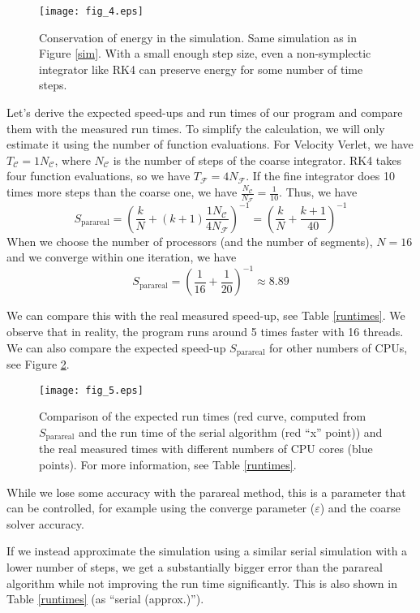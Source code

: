 \documentclass[conference]{IEEEtran}
\begin{document}
\begin{figure}[htbp]
\centerline{\texttt{[image: fig\_4.eps]}}
\caption{Conservation of energy in the simulation. Same simulation as in Figure \ref{sim}. With a small enough step size, even a non-symplectic integrator like RK4 can preserve energy for some number of time steps.}
\label{energy}
\end{figure}

Let's derive the expected speed-ups and run times of our program and compare them with the measured run times. To simplify the calculation, we will only estimate it using the number of function evaluations. For Velocity Verlet, we have $T_\mathcal{C} = 1N_\mathcal{C}$, where $N_\mathcal{C}$ is the number of steps of the coarse integrator. RK4 takes four function evaluations, so we have $T_\mathcal{F} = 4N_\mathcal{F}$. If the fine integrator does 10 times more steps than the coarse one, we have $\frac{N_\mathcal{C}}{N_\mathcal{F}} = \frac{1}{10}$. Thus, we have
$$
S_\text{parareal} = \left(\frac{k}{N} + (k+1)\frac{1N_\mathcal{C}}{4N_\mathcal{F}}\right)^{-1} = \left(\frac{k}{N} + \frac{k+1}{40}\right)^{-1}
$$
When we choose the number of processors (and the number of segments), $N = 16$ and we converge within one iteration, we have
$$
S_\text{parareal} = \left(\frac{1}{16} + \frac{1}{20}\right)^{-1} \approx 8.89
$$

We can compare this with the real measured speed-up, see Table \ref{runtimes}. We observe that in reality, the program runs around 5 times faster with 16 threads. We can also compare the expected speed-up $S_\text{parareal}$ for other numbers of CPUs, see Figure \ref{speeds}.

\begin{figure}[htbp]
\centerline{\texttt{[image: fig\_5.eps]}}
\caption{Comparison of the expected run times (red curve, computed from $S_\text{parareal}$ and the run time of the serial algorithm (red ``x'' point)) and the real measured times with different numbers of CPU cores (blue points). For more information, see Table \ref{runtimes}.}
\label{speeds}
\end{figure}

While we lose some accuracy with the parareal method, this is a parameter that can be controlled, for example using the converge parameter ($\varepsilon$) and the coarse solver accuracy. 

If we instead approximate the simulation using a similar serial simulation with a lower number of steps, we get a substantially bigger error than the parareal algorithm while not improving the run time significantly. This is also shown in Table \ref{runtimes} (as ``serial (approx.)'').
\end{document}
